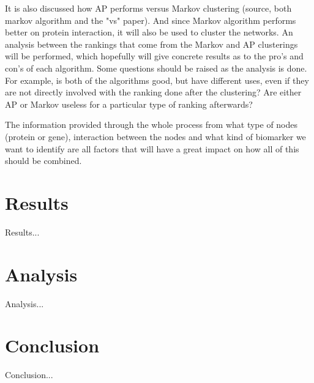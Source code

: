 \documentclass[UKenglish]{ifimaster}
\begin{document}
It is also discussed how AP performs versus Markov clustering (source, both markov algorithm and the "vs" paper). And
since Markov algorithm performs better on protein interaction, it will also be used to cluster the networks. An analysis
between the rankings that come from the Markov and AP clusterings will be performed, which hopefully will give concrete
results as to the pro's and con's of each algorithm. Some questions should be raised as the analysis is done. For
example, is both of the algorithms good, but have different uses, even if they are not directly involved with the
ranking done after the clustering? Are either AP or Markov useless for a particular type of ranking afterwards?

The information provided through the whole process from what type of nodes (protein or gene), interaction between the
nodes and what kind of biomarker we want to identify are all factors that will have a great impact on how all of this
should be combined.
\part{Results}
Results...
\part{Analysis}
Analysis...
\part{Conclusion}
Conclusion...
\backmatter{}
\printbibliography
\end{document}
